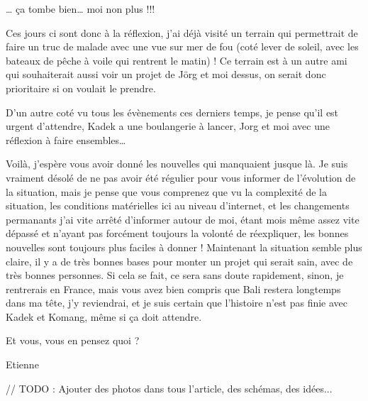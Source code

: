\par
… ça tombe bien… moi non plus !!!

\par
Ces jours ci sont donc à la réflexion, j’ai déjà visité un terrain qui permettrait de faire un truc de malade avec une vue sur mer de fou (coté lever de soleil, avec les bateaux de pêche à voile qui rentrent le matin) ! Ce terrain est à un autre ami qui souhaiterait aussi voir un projet de Jörg et moi dessus, on serait donc prioritaire si on voulait le prendre.

\par
D’un autre coté vu tous les évènements ces derniers temps, je pense qu’il est urgent d’attendre, Kadek a une boulangerie à lancer, Jorg et moi avec une réflexion à faire ensembles…

\par
Voilà, j’espère vous avoir donné les nouvelles qui manquaient jusque là. Je suis vraiment désolé de ne pas avoir été régulier pour vous informer de l’évolution de la situation, mais je pense que vous comprenez que vu la complexité de la situation, les conditions matérielles ici au niveau d’internet, et les changements permanants j’ai vite arrêté d’informer autour de moi, étant mois même assez vite dépassé et n’ayant pas forcément toujours la volonté de réexpliquer, les bonnes nouvelles sont toujours plus faciles à donner ! Maintenant la situation semble plus claire, il y a de très bonnes bases pour monter un projet qui serait sain, avec de très bonnes personnes. Si cela se fait, ce sera sans doute rapidement, sinon, je rentrerais en France, mais vous avez bien compris que Bali restera longtemps dans ma tête, j’y reviendrai, et je suis certain que l’histoire n’est pas finie avec Kadek et Komang, même si ça doit attendre.

\par
Et vous, vous en pensez quoi ?

\par
Etienne

\par
// TODO : Ajouter des photos dans tous l'article, des schémas, des idées...

\par

\vfill
